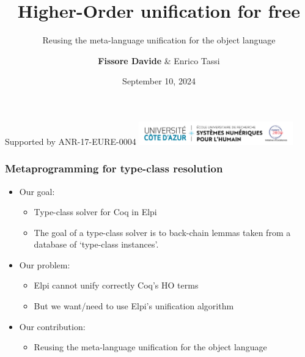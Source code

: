 \documentclass{pres}
\author{\textbf{Fissore Davide} \& Enrico Tassi}
\title{Higher-Order unification for free}
\subtitle{Reusing the meta-language unification for the object language}
\date{September 10, 2024}
\newcommand{\sepFrame}[1]{
  \section{#1}
  \begin{frame}
    \centering
    {\usebeamerfont*{frametitle}\usebeamercolor[fg]{frametitle} #1}
  \end{frame}
}
\begin{document}


\begin{frame}
  \titlepage
  \tiny Supported by ANR-17-EURE-0004 \hfill \includegraphics[height=1cm,valign=c]{UCA_DS4H_France2030.png}
\end{frame}





\begin{frame}[fragile]
  \frametitle{Metaprogramming for type-class resolution}

  \begin{itemize}
    \item Our goal:
          \begin{itemize}
            \item Type-class solver for Coq in Elpi
            \item The goal of a type-class solver is to back-chain lemmas
                  taken from a database of `type-class instances'. 
          \end{itemize}
    \item Our problem:
          \begin{itemize}
            \item Elpi cannot unify correctly Coq's HO terms
            \item But we want/need to use Elpi's unification algorithm
          \end{itemize}
    \item Our contribution:
          \begin{itemize}
            \item Reusing the meta-language unification for the object language
          \end{itemize}
  \end{itemize}

\end{frame}
\end{document}
